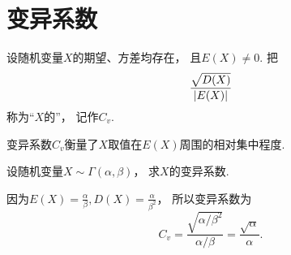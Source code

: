 \section{变异系数}
\begin{definition}
设随机变量\(X\)的期望、方差均存在，
且\(E(X) \neq 0\).
把\[
	\frac{\sqrt{D(X)}}{\abs{E(X)}}
\]称为“\(X\)的”，
记作\(C_v\).
\end{definition}
变异系数\(C_v\)衡量了\(X\)取值在\(E(X)\)周围的相对集中程度.

\begin{example}
设随机变量\(X \sim \Gamma(\alpha,\beta)\)，
求\(X\)的变异系数.
\begin{solution}
因为\(E(X)=\frac\alpha\beta,
D(X)=\frac{\alpha}{\beta^2}\)，
所以变异系数为\[
	C_v = \frac{\sqrt{\alpha/\beta^2}}{\alpha/\beta}
	= \frac{\sqrt{\alpha}}{\alpha}.
\]
\end{solution}
\end{example}
